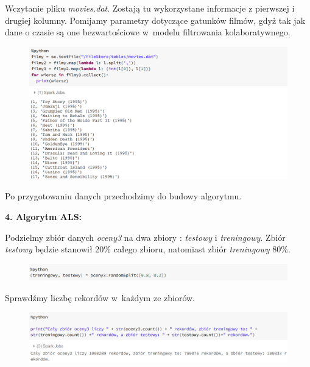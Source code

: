 \documentclass[12pt,a4paper]{report}
\begin{document}
Wczytanie pliku \textit{movies.dat}. 
Zostają tu wykorzystane informacje z pierwszej i drugiej kolumny. Pomijamy parametry dotyczące gatunków filmów, gdyż tak jak dane o czasie są one bezwartościowe w~modelu filtrowania kolaboratywnego.

\begin{figure}[H]
\includegraphics[scale=0.5]{obrazy/ALS5.PNG} 
\end{figure}

Po przygotowaniu danych przechodzimy do budowy algorytmu.
\bigskip

\textbf{4. Algorytm ALS:}

Podzielmy zbiór danych \textit{oceny3} na dwa zbiory : \textit{testowy} i \textit{treningowy}.
Zbiór \textit{testowy} będzie stanowił 20\% całego zbioru, natomiast zbiór \textit{treningowy} 80\%.

\begin{figure}[H]
\includegraphics[scale=0.5]{obrazy/ALS6.PNG} 
\end{figure}

Sprawdźmy liczbę rekordów w~każdym ze zbiorów.

\begin{figure}[H]
\includegraphics[scale=0.5]{obrazy/ALS7.PNG} 
\end{figure}
\end{document}
